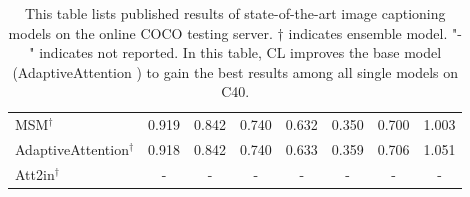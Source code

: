 \begin{table}
\begin{tabular}{lccccccc}
MSM$^\dagger$ \cite{yao2016boosting} & 0.919 & 0.842 & 0.740 & 0.632 & 0.350 & 0.700 & 1.003 \\
AdaptiveAttention$^\dagger$ \cite{lu2016knowing} & 0.918 & 0.842 & 0.740 & 0.633 & 0.359 & 0.706 & 1.051 \\
Att2in$^\dagger$ \cite{rennie2016self} & - & - & - & - & - & - & - \\
\bottomrule
\end{tabular}
\vspace{1mm}
\caption{\small This table lists published results of state-of-the-art image captioning models on the online COCO testing server.
$\dagger$ indicates ensemble model. 
"-" indicates not reported.
In this table, CL improves the base model (AdaptiveAttention \cite{lu2016knowing}) to gain the best results among all single models on C40.}
\label{tab:cocoonline}
\vspace{-5mm}
\end{table}
